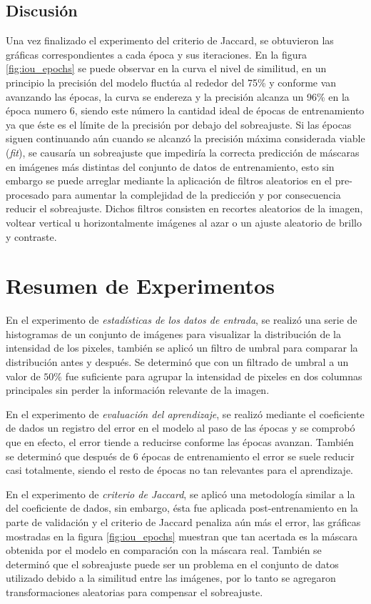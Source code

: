 \subsection{Discusión}
Una vez finalizado el experimento del criterio de Jaccard, se obtuvieron las gráficas correspondientes a cada época y sus iteraciones. En la figura \ref{fig:iou_epochs} se puede observar en la curva el nivel de similitud, en un principio la precisión del modelo fluctúa al rededor del 75\% y conforme van avanzando las épocas, la curva se endereza y la precisión alcanza un 96\% en la época numero 6, siendo este número la cantidad ideal de épocas de entrenamiento ya que éste es el límite de la precisión por debajo del sobreajuste. Si las épocas siguen continuando aún cuando se alcanzó la precisión máxima considerada viable (\emph{fit}), se causaría un sobreajuste que impediría la correcta predicción de máscaras en imágenes más distintas del conjunto de datos de entrenamiento, esto sin embargo se puede arreglar mediante la aplicación de filtros aleatorios en el pre-procesado para aumentar la complejidad de la predicción y por consecuencia reducir el sobreajuste. Dichos filtros consisten en recortes aleatorios de la imagen, voltear vertical u horizontalmente imágenes al azar o un ajuste aleatorio de brillo y contraste.


\section{Resumen de Experimentos}

En el experimento de \emph{estadísticas de los datos de entrada}, se realizó una serie de histogramas de un conjunto de imágenes para visualizar la distribución de la intensidad de los pixeles, también se aplicó un filtro de umbral para comparar la distribución antes y después. Se determinó que con un filtrado de umbral a un valor de $50\%$ fue suficiente para agrupar la intensidad de pixeles en dos columnas principales sin perder la información relevante de la imagen.

En el experimento de \emph{evaluación del aprendizaje}, se realizó mediante el coeficiente de dados un registro del error en el modelo al paso de las épocas y se comprobó que en efecto, el error tiende a reducirse conforme las épocas avanzan. También se determinó que después de 6 épocas de entrenamiento el error se suele reducir casi totalmente, siendo el resto de épocas no tan relevantes para el aprendizaje.

En el experimento de \emph{criterio de Jaccard}, se aplicó una metodología similar a la del coeficiente de dados, sin embargo, ésta fue aplicada post-entrenamiento en la parte de validación y el criterio de Jaccard penaliza aún más el error, las gráficas mostradas en la figura \ref{fig:iou_epochs} muestran que tan acertada es la máscara obtenida por el modelo en comparación con la máscara real. También se determinó que el sobreajuste puede ser un problema en el conjunto de datos utilizado debido a la similitud entre las imágenes, por lo tanto se agregaron transformaciones aleatorias para compensar el sobreajuste.


